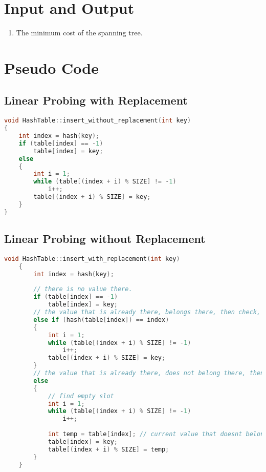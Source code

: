 \documentclass[11pt]{article}
\begin{document}
\section{Input and Output}
\begin{enumerate}
    \item The minimum cost of the spanning tree.
\end{enumerate}

\section{Pseudo Code}
\subsection{Linear Probing with Replacement}
\begin{lstlisting}[language=C++]
void HashTable::insert_without_replacement(int key)
{
    int index = hash(key);
    if (table[index] == -1)
        table[index] = key;
    else
    {
        int i = 1;
        while (table[(index + i) % SIZE] != -1)
            i++;
        table[(index + i) % SIZE] = key;
    }
}

\end{lstlisting}
\subsection{Linear Probing without Replacement}
\begin{lstlisting}[language=C++]
void HashTable::insert_with_replacement(int key)
    {
        int index = hash(key);
    
        // there is no value there.
        if (table[index] == -1)
            table[index] = key;
        // the value that is already there, belongs there, then check, and then find another empty slot and insert there.
        else if (hash(table[index]) == index)
        {
            int i = 1;
            while (table[(index + i) % SIZE] != -1)
                i++;
            table[(index + i) % SIZE] = key;
        }
        // the value that is already there, does not belong there, then replace it with the new value, and push the existing value down.
        else
        {
            // find empty slot
            int i = 1;
            while (table[(index + i) % SIZE] != -1)
                i++;
    
            int temp = table[index]; // current value that doesnt belong there.
            table[index] = key;
            table[(index + i) % SIZE] = temp;
        }
    }
    
\end{lstlisting}
\end{document}
